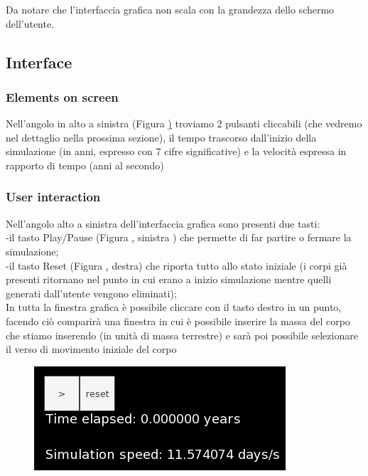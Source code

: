 \documentclass{article}
\begin{document}
Da notare che l'interfaccia grafica non scala con la grandezza dello schermo dell'utente.


\subsection{Interface}
\subsubsection{Elements on screen}
Nell'angolo in alto a sinistra (Figura \href{playpause} ) troviamo 2 pulsanti cliccabili (che vedremo nel dettaglio nella prossima sezione), 
il tempo trascorso dall'inizio della simulazione (in anni, espresso con 7 cifre significative) e la velocità espressa in rapporto di tempo (anni al secondo)

\subsubsection{User interaction}
Nell'angolo alto a sinistra dell'interfaccia grafica sono presenti due tasti: \\
-il tasto Play/Pause (Figura \href{playpause}, sinistra ) che permette di far partire o fermare la simulazione;\\
-il tasto Reset (Figura \href{playpause}, destra) che riporta tutto allo stato iniziale (i corpi già presenti ritornano nel punto in cui erano a inizio simulazione mentre quelli generati dall'utente vengono eliminati); \\
In tutta la finestra grafica è possibile cliccare con il tasto destro in un punto, facendo ciò comparirà una finestra in cui è possibile inserire la massa del corpo che stiamo inserendo (in unità di massa terrestre) e sarà poi possibile selezionare il verso di movimento iniziale del corpo

\begin{figure} [H]
    \centering
    \includegraphics[height=.20\linewidth]{Playpause.png}
    \label{playpause}
\end{figure}
\end{document}
